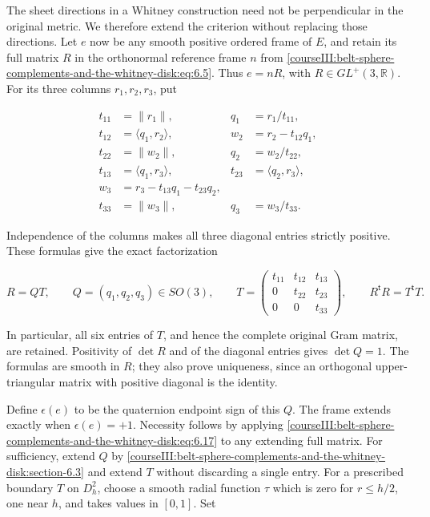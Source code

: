 The sheet directions in a Whitney construction need not be perpendicular in the original metric. We therefore extend the criterion without replacing those directions. Let \(e\) now be any smooth positive ordered frame of \(E\), and retain its full matrix \(R\) in the orthonormal reference frame \(n\) from \eqref{courseIII:belt-sphere-complements-and-the-whitney-disk:eq:6.5}. Thus \(e=nR\), with \(R\in GL^+(3,\mathbb R)\). For its three columns \(r_1,r_2,r_3\), put

\begin{equation}
\begin{aligned}
t_{11}&=\|r_1\|,&q_1&=r_1/t_{11},\\
t_{12}&=\langle q_1,r_2\rangle,&
w_2&=r_2-t_{12}q_1,\\
t_{22}&=\|w_2\|,&q_2&=w_2/t_{22},\\
t_{13}&=\langle q_1,r_3\rangle,&
t_{23}&=\langle q_2,r_3\rangle,\\
w_3&=r_3-t_{13}q_1-t_{23}q_2,\\
t_{33}&=\|w_3\|,&q_3&=w_3/t_{33}.
\end{aligned}
\label{courseIII:belt-sphere-complements-and-the-whitney-disk:eq:6.17}
\end{equation}

Independence of the columns makes all three diagonal entries strictly positive. These formulas give the exact factorization

\begin{equation}
R=QT,\qquad
Q=(q_1,q_2,q_3)\in SO(3),\qquad
T=
\begin{pmatrix}
t_{11}&t_{12}&t_{13}\\
0&t_{22}&t_{23}\\
0&0&t_{33}
\end{pmatrix},\qquad
R^{\mathsf t}R=T^{\mathsf t}T.
\label{courseIII:belt-sphere-complements-and-the-whitney-disk:eq:6.18}
\end{equation}

In particular, all six entries of \(T\), and hence the complete original Gram matrix, are retained. Positivity of \(\det R\) and of the diagonal entries gives \(\det Q=1\). The formulas are smooth in \(R\); they also prove uniqueness, since an orthogonal upper-triangular matrix with positive diagonal is the identity.

Define \(\epsilon(e)\) to be the quaternion endpoint sign of this \(Q\). The frame extends exactly when \(\epsilon(e)=+1\). Necessity follows by applying \eqref{courseIII:belt-sphere-complements-and-the-whitney-disk:eq:6.17} to any extending full matrix. For sufficiency, extend \(Q\) by \cref{courseIII:belt-sphere-complements-and-the-whitney-disk:section-6.3} and extend \(T\) without discarding a single entry. For a prescribed boundary \(T\) on \(D_h^2\), choose a smooth radial function \(\tau\) which is zero for \(r\leq h/2\), one near \(h\), and takes values in \([0,1]\). Set

